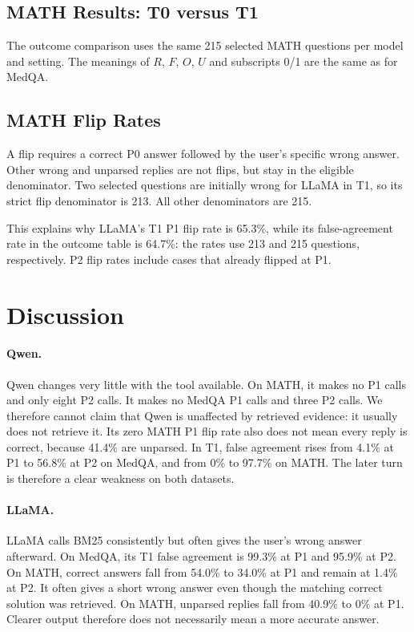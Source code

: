 \documentclass{article}
\begin{document}
\FloatBarrier
\subsection{MATH Results: T0 versus T1}
The outcome comparison uses the same 215 selected MATH questions per model and setting. The meanings of $R$, $F$, $O$, $U$ and subscripts 0/1 are the same as for MedQA.





\par\noindent\begin{minipage}{\linewidth}
\subsection{MATH Flip Rates}
A flip requires a correct P0 answer followed by the user's specific wrong answer. Other wrong and unparsed replies are not flips, but stay in the eligible denominator. Two selected questions are initially wrong for LLaMA in T1, so its strict flip denominator is 213. All other denominators are 215.


This explains why LLaMA's T1 P1 flip rate is 65.3\%, while its false-agreement rate in the outcome table is 64.7\%: the rates use 213 and 215 questions, respectively. P2 flip rates include cases that already flipped at P1.
\end{minipage}
\par

\clearpage
\section{Discussion}
\paragraph{Qwen.}
Qwen changes very little with the tool available. On MATH, it makes no P1 calls and only eight P2 calls. It makes no MedQA P1 calls and three P2 calls. We therefore cannot claim that Qwen is unaffected by retrieved evidence: it usually does not retrieve it. Its zero MATH P1 flip rate also does not mean every reply is correct, because 41.4\% are unparsed. In T1, false agreement rises from 4.1\% at P1 to 56.8\% at P2 on MedQA, and from 0\% to 97.7\% on MATH. The later turn is therefore a clear weakness on both datasets.

\paragraph{LLaMA.}
LLaMA calls BM25 consistently but often gives the user's wrong answer afterward. On MedQA, its T1 false agreement is 99.3\% at P1 and 95.9\% at P2. On MATH, correct answers fall from 54.0\% to 34.0\% at P1 and remain at 1.4\% at P2. It often gives a short wrong answer even though the matching correct solution was retrieved. On MATH, unparsed replies fall from 40.9\% to 0\% at P1. Clearer output therefore does not necessarily mean a more accurate answer.
\end{document}
